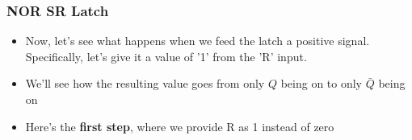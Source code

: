 \documentclass{beamer}
\begin{document}
   		\begin{frame}
   			\frametitle{NOR SR Latch}
   			\begin{itemize}
   				\item Now, let's see what happens when we feed the latch a positive signal. Specifically, let's give it a value of '1' from the 'R' input.
   				\item We'll see how the resulting value goes from only $Q$ being on to only $\bar{Q}$ being on
   				\item Here's the \textbf{first step}, where we provide R as 1 instead of zero
   			\end{itemize}
   			
   			{
   			\centering
   			


\begin{tikzpicture}[x=0.75pt,y=0.75pt,yscale=-1,xscale=1]


\end{tikzpicture}}
\end{frame}
\end{document}

